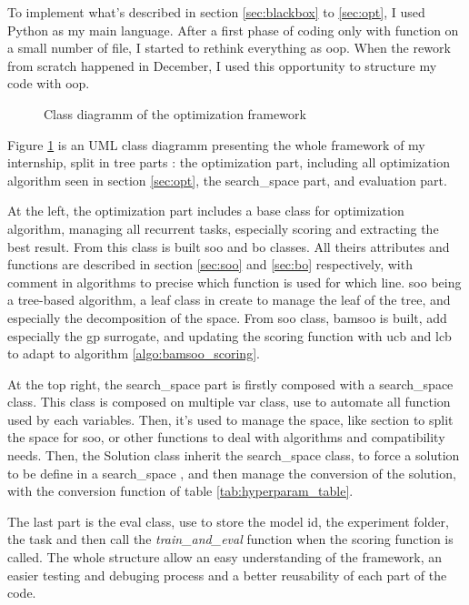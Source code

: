 To implement what's described in section \ref{sec:blackbox} to \ref{sec:opt}, I used Python as my main language. After a first phase of coding only with function on a small number of file, I started to rethink everything as \acrfull{oop}. When the rework from scratch happened in December, I used this opportunity to structure my code with \acrshort{oop}. 

\begin{figure}[h]
    \centering
    
    \caption{Class diagramm of the optimization framework}
    \label{fig:class_diag}
\end{figure}

Figure \ref{fig:class_diag} is an UML class diagramm presenting the whole framework of my internship, split in tree parts : the optimization part, including all optimization algorithm seen in section \ref{sec:opt}, the \gls{search_space}  part, and evaluation part.

At the left, the optimization part includes a base class for optimization algorithm, managing all recurrent tasks, especially scoring and extracting the best result. From this class is built \acrshort{soo} and \acrshort{bo} classes. All theirs attributes and functions are described in section \ref{sec:soo} and \ref{sec:bo} respectively, with comment in algorithms to precise which function is used for which line. \acrshort{soo} being a tree-based algorithm, a leaf class in create to manage the leaf of the tree, and especially the decomposition of the space. From \acrshort{soo} class, \acrshort{bamsoo} is built, add especially the \acrshort{gp} surrogate, and updating the scoring function with \acrshort{ucb} and \acrshort{lcb} to adapt to algorithm \ref{algo:bamsoo_scoring}.

At the top right, the \gls{search_space}  part is firstly composed with a \gls{search_space}  class. This class is composed on multiple var class, use to automate all function used by each variables. Then, it's used to manage the space, like section to split the space for \acrshort{soo}, or other functions to deal with algorithms and compatibility needs. Then, the Solution class inherit the \gls{search_space}  class, to force a solution to be define in a \gls{search_space} , and then manage the conversion of the solution, with the conversion function of table \ref{tab:hyperparam_table}.

The last part is the eval class, use to store the model id, the experiment folder, the task and then call the \textit{train\_and\_eval} function when the scoring function is called. The whole structure allow an easy understanding of the framework, an easier testing and debuging process and a better reusability of each part of the code. 

